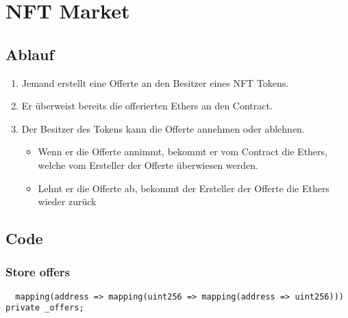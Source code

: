 \section{NFT Market}
\subsection{Ablauf}
\begin{enumerate}
  \item Jemand erstellt eine Offerte an den Besitzer eines NFT Tokens.
  \item Er überweist bereits die offerierten Ethers an den Contract.
  \item Der Besitzer des Tokens kann die Offerte annehmen oder ablehnen.
  \begin{itemize}
    \item Wenn er die Offerte annimmt, bekommt er vom Contract die Ethers, welche vom Ersteller der Offerte überwiesen werden.
    \item Lehnt er die Offerte ab, bekommt der Ersteller der Offerte die Ethers wieder zurück
  \end{itemize} 
\end{enumerate}

\subsection{Code}
\subsubsection{Store offers}
\begin{lstlisting}
  mapping(address => mapping(uint256 => mapping(address => uint256))) private _offers;
\end{lstlisting}